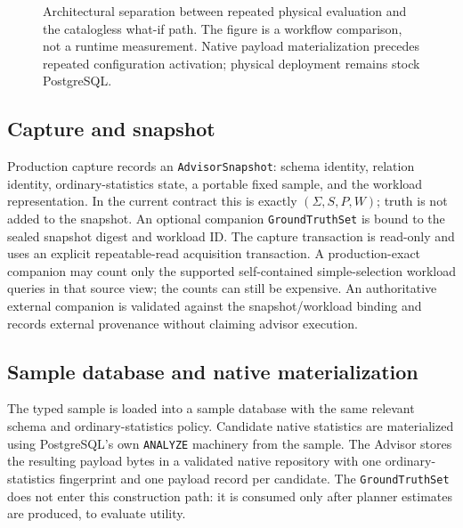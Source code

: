 \begin{figure}[t]
  \caption{Architectural separation between repeated physical evaluation and
  the catalogless what-if path. The figure is a workflow comparison, not a
  runtime measurement. Native payload materialization precedes repeated
  configuration activation; physical deployment remains stock PostgreSQL.}
  \label{fig:whatif-loop}
\end{figure}

\subsection{Capture and snapshot}

Production capture records an \texttt{AdvisorSnapshot}: schema identity,
relation identity, ordinary-statistics state, a portable fixed sample, and the
workload representation. In the current contract this is exactly $(\Sigma,S,P,W)$;
truth is not added to the snapshot. An optional companion
\texttt{GroundTruthSet} is bound to the sealed snapshot digest and workload ID.
The capture transaction is read-only and uses an explicit repeatable-read
acquisition transaction. A production-exact companion may count only the
supported self-contained simple-selection workload queries in that source
view; the counts can still be expensive. An authoritative external companion
is validated against the snapshot/workload binding and records external
provenance without claiming advisor execution.

\subsection{Sample database and native materialization}

The typed sample is loaded into a sample database with the same relevant schema
and ordinary-statistics policy. Candidate native statistics are materialized
using PostgreSQL's own \texttt{ANALYZE} machinery from the sample. The Advisor
stores the resulting payload bytes in a validated native repository with one
ordinary-statistics fingerprint and one payload record per candidate. The
\texttt{GroundTruthSet} does not enter this construction path: it is consumed
only after planner estimates are produced, to evaluate utility.

